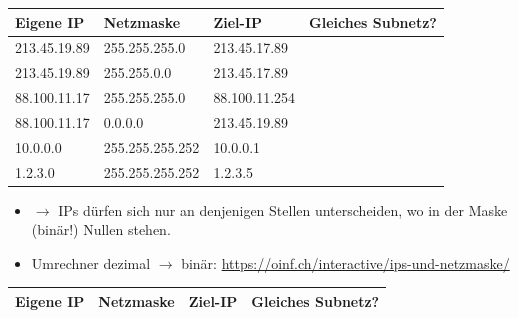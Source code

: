 \begin{myexercise}
	\begin{table}[H]
		\centering
		\begin{tabular}{l|l|l|m{2cm}}

			\textbf{Eigene \gls{IP}} & \textbf{Netzmaske} & \textbf{Ziel-\gls{IP}} & \textbf{Gleiches \newline Subnetz?} \\\midrule\midrule

			213.45.19.89             & 255.255.255.0      & 213.45.17.89           & \fldT                               \\\midrule

			213.45.19.89             & 255.255.0.0        & 213.45.17.89           & \fldT                               \\\midrule

			88.100.11.17             & 255.255.255.0      & 88.100.11.254          & \fldT                               \\\midrule

			88.100.11.17             & 0.0.0.0            & 213.45.19.89           & \fldT                               \\\midrule

			10.0.0.0                 & 255.255.255.252    & 10.0.0.1               & \fldT                               \\\midrule
			1.2.3.0                  & 255.255.255.252    & 1.2.3.5                & \fldT
		\end{tabular}
	\end{table}
	\begin{itemize}
		\item $\rightarrow$ \gls{IP}s dürfen sich nur an denjenigen Stellen unterscheiden, wo in der Maske (binär!) Nullen stehen.
		\item Umrechner dezimal $\rightarrow$ binär: \url{https://oinf.ch/interactive/ips-und-netzmaske/}
	\end{itemize}
	\begin{myanswer}

		\begin{table}[H]
			\centering
			\begin{tabular}{l|l|l|l}

				\textbf{Eigene IP} & \textbf{Netzmaske} & \textbf{Ziel-IP}                       & \textbf{Gleiches Subnetz?}     \\\midrule\midrule


\end{tabular}
\end{table}
\end{myanswer}
\end{myexercise}
